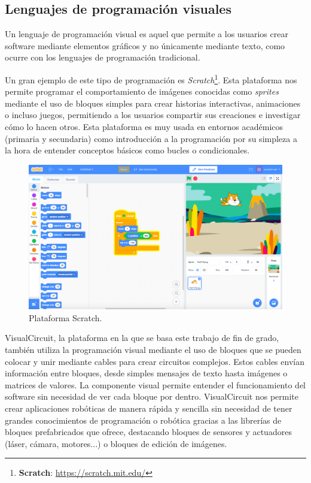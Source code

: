 \subsection{Lenguajes de programación visuales}
\label{subsec:vis_prog}

Un lenguaje de programación visual es aquel que permite a los usuarios crear software mediante elementos gráficos y no únicamente mediante texto,
como ocurre con los lenguajes de programación tradicional.

Un gran ejemplo de este tipo de programación es \textit{Scratch}\footnote{\textbf{Scratch}: \url{https://scratch.mit.edu/}}.
Esta plataforma nos permite programar el comportamiento de imágenes conocidas como \textit{sprites} mediante el uso de bloques simples para crear
historias interactivas, animaciones o incluso juegos, permitiendo a los usuarios compartir sus creaciones e investigar cómo lo hacen otros.
Esta plataforma es muy usada en entornos académicos (primaria y secundaria) como introducción a la programación por su simpleza a la hora de entender
conceptos básicos como bucles o condicionales. 

\begin{figure} [H]
  \begin{center}
    \includegraphics[width=12cm]{figs/c1/scratch.png}
  \end{center}
  \caption[Scratch]{Plataforma Scratch.}
  \label{fig:scratch}
\end{figure}

VisualCircuit, la plataforma en la que se basa este trabajo de fin de grado, también utiliza la programación visual mediante el uso de bloques que se
pueden colocar y unir mediante cables para crear circuitos complejos.
Estos cables envían información entre bloques, desde simples mensajes de texto hasta imágenes o matrices de valores.
La componente visual permite entender el funcionamiento del software sin necesidad de ver cada bloque por dentro.
VisualCircuit nos permite crear aplicaciones robóticas de manera rápida y sencilla sin necesidad de tener grandes conocimientos de programación
o robótica gracias a las librerías de bloques prefabricados que ofrece, destacando bloques de sensores y actuadores (láser, cámara, motores...) o bloques
de edición de imágenes.

